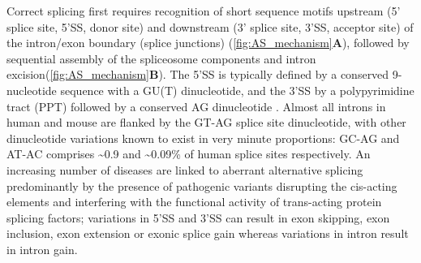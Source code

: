Correct splicing first requires recognition of short sequence motifs upstream (5' splice site, 5'SS, donor site) and downstream (3' splice site, 3'SS, acceptor site) of the intron/exon boundary (splice junctions) (\cref{fig:AS_mechanism}\textbf{A}),  followed by sequential assembly of the spliceosome components and intron excision\cite{Herzel2017}(\cref{fig:AS_mechanism}\textbf{B}). The 5'SS is typically defined by a conserved 9-nucleotide sequence with a GU(T) dinucleotide, and the 3'SS by a polypyrimidine tract (PPT) followed by a conserved AG dinucleotide \cite{Will2011}. Almost all introns in human and mouse are flanked by the GT-AG splice site dinucleotide\cite{Sheth2006}, with other dinucleotide variations known to exist in very minute proportions: GC-AG and AT-AC comprises \textasciitilde0.9 and \textasciitilde0.09\% of human splice sites respectively\cite{Parada2014}. An increasing number of diseases are linked to aberrant alternative splicing predominantly by the presence of pathogenic variants disrupting the cis-acting elements and interfering with the functional activity of trans-acting protein splicing factors; variations in 5'SS and 3'SS can result in exon skipping, exon inclusion, exon extension or exonic splice gain whereas variations in intron result in intron gain.


